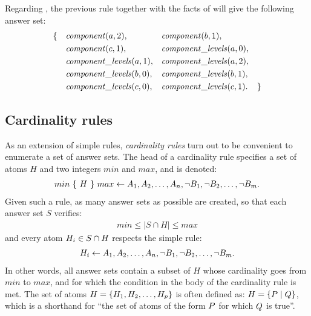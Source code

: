 \begin{example}
Regarding , the previous rule together with the facts of 
will give the following answer set:
\begin{align*}
  &\{&&\mathit{component}(a, 2),
  &&\mathit{component}(b, 1), \\
  &&&\mathit{component}(c, 1),
  &&\mathit{component\_levels}(a, 0), \\
  &&&\mathit{component\_levels}(a, 1),
  &&\mathit{component\_levels}(a, 2), \\
  &&&\mathit{component\_levels}(b, 0),
  &&\mathit{component\_levels}(b, 1), \\
  &&&\mathit{component\_levels}(c, 0),
  &&\mathit{component\_levels}(c, 1). &\}
\end{align*}
\end{example}



\subsection{Cardinality rules}
\label{sssec:cardinality_rules}
As an extension of simple rules, \emph{cardinality rules} turn out to be convenient to enumerate a set of answer sets.
The head of a cardinality rule specifies a set of atoms $H$ and two integers $min$ and $max$, and is denoted:
\begin{align*}
  min\ \{\ H\ \}\ max \leftarrow A_1, A_2, \dots, A_n, \neg B_1, \neg B_2, \dots, \neg B_m.
\end{align*}
Given such a rule, as many answer sets as possible are created, so that each answer set $S$ verifies:
\begin{align*}
  min \leq |S \cap H| \leq max
\end{align*}
and every atom $H_i \in S \cap H$ respects the simple rule:
\begin{align*}
  H_i \leftarrow A_1, A_2, \dots, A_n, \neg B_1, \neg B_2, \dots, \neg B_m.
\end{align*}
In other words, all answer sets contain a subset of $H$ whose cardinality goes from $min$ to $max$,
and for which the condition in the body of the cardinality rule is met.
The set of atoms $H = \{ H_1, H_2, \dots, H_p \}$ is often defined as: $H = \{ P \mid Q \}$,
which is a shorthand for “the set of atoms of the form $P$ for which $Q$ is true”.

